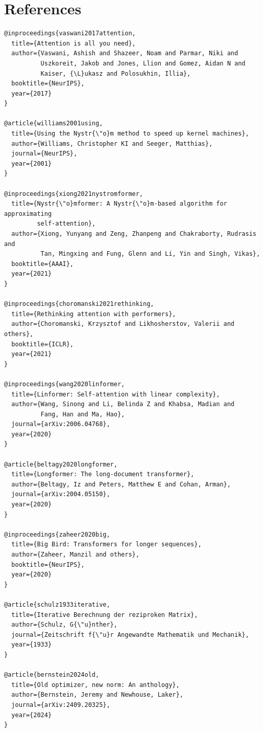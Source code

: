 
\section{References}

\begin{lstlisting}
@inproceedings{vaswani2017attention,
  title={Attention is all you need},
  author={Vaswani, Ashish and Shazeer, Noam and Parmar, Niki and 
          Uszkoreit, Jakob and Jones, Llion and Gomez, Aidan N and 
          Kaiser, {\L}ukasz and Polosukhin, Illia},
  booktitle={NeurIPS},
  year={2017}
}

@article{williams2001using,
  title={Using the Nystr{\"o}m method to speed up kernel machines},
  author={Williams, Christopher KI and Seeger, Matthias},
  journal={NeurIPS},
  year={2001}
}

@inproceedings{xiong2021nystromformer,
  title={Nystr{\"o}mformer: A Nystr{\"o}m-based algorithm for approximating 
         self-attention},
  author={Xiong, Yunyang and Zeng, Zhanpeng and Chakraborty, Rudrasis and 
          Tan, Mingxing and Fung, Glenn and Li, Yin and Singh, Vikas},
  booktitle={AAAI},
  year={2021}
}

@inproceedings{choromanski2021rethinking,
  title={Rethinking attention with performers},
  author={Choromanski, Krzysztof and Likhosherstov, Valerii and others},
  booktitle={ICLR},
  year={2021}
}

@inproceedings{wang2020linformer,
  title={Linformer: Self-attention with linear complexity},
  author={Wang, Sinong and Li, Belinda Z and Khabsa, Madian and 
          Fang, Han and Ma, Hao},
  journal={arXiv:2006.04768},
  year={2020}
}

@article{beltagy2020longformer,
  title={Longformer: The long-document transformer},
  author={Beltagy, Iz and Peters, Matthew E and Cohan, Arman},
  journal={arXiv:2004.05150},
  year={2020}
}

@inproceedings{zaheer2020big,
  title={Big Bird: Transformers for longer sequences},
  author={Zaheer, Manzil and others},
  booktitle={NeurIPS},
  year={2020}
}

@article{schulz1933iterative,
  title={Iterative Berechnung der reziproken Matrix},
  author={Schulz, G{\"u}nther},
  journal={Zeitschrift f{\"u}r Angewandte Mathematik und Mechanik},
  year={1933}
}

@article{bernstein2024old,
  title={Old optimizer, new norm: An anthology},
  author={Bernstein, Jeremy and Newhouse, Laker},
  journal={arXiv:2409.20325},
  year={2024}
}


\end{lstlisting}
